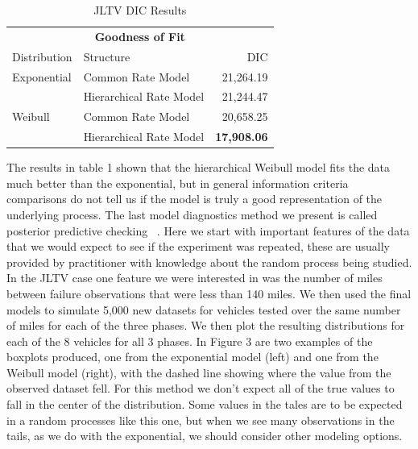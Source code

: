 \documentclass[12pt]{article}
\begin{document}
\begin{table}[h]
\centering
\begin{tabular}{|l|l|r|}
\multicolumn{3}{c}{\textbf{Goodness of Fit}} \\
\cline{1-3}
Distribution    & Structure & DIC \\
\hline
Exponential   & Common Rate Model                     & 21,264.19             \\
              & Hierarchical Rate Model               & 21,244.47             \\
Weibull       & Common Rate Model                     & 20,658.25             \\
              & Hierarchical Rate Model               & \textbf{17,908.06}    \\
\hline
\end{tabular}
\caption{JLTV DIC Results}
\label{table:ta}
\end{table}

The results in table 1 shown that the hierarchical Weibull model fits the data
much better than the exponential, but in general information criteria
comparisons do not tell us if the model is truly a good representation of the
underlying process. The last model diagnostics method we present is called
posterior predictive checking ~\cite{ref5}.  Here we start with important
features of the data that we would expect to see if the experiment was repeated,
these are usually provided by practitioner with knowledge about the random
process being studied. In the JLTV case one feature we were interested in was
the number of miles between failure observations that were less than 140 miles.
We then used the final models to simulate 5,000 new datasets for vehicles tested
over the same number of miles for each of the three phases. We then plot the
resulting distributions for each of the 8 vehicles for all 3 phases.  In Figure
3 are two examples of the boxplots produced, one from the exponential model
(left) and one from the Weibull model (right), with the dashed line showing
where the value from the observed dataset fell.  For this method we don’t expect
all of the true values to fall in the center of the distribution. Some values in
the tales are to be expected in a random processes like this one, but when we
see many observations in the tails, as we do with the exponential, we should
consider other modeling options.
\end{document}
